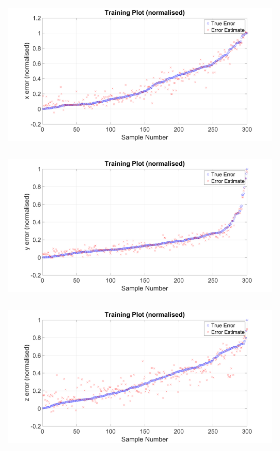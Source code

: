 \begin{figure}
  \begin{subfigure}{0.48\textwidth}
    \begin{subfigure}{\textwidth}
      \includegraphics[clip, trim = 80 0 100 0, width=\textwidth]{figures/chapter4/tr_x}
    \end{subfigure}
    \begin{subfigure}{\textwidth}
      \includegraphics[clip, trim = 80 0 100 0, width=\textwidth]{figures/chapter4/tr_y}
    \end{subfigure}
    \begin{subfigure}{\textwidth}
      \includegraphics[clip, trim = 80 0 100 0, width=\textwidth]{figures/chapter4/tr_z}

\end{subfigure}
\end{subfigure}
\end{figure}
